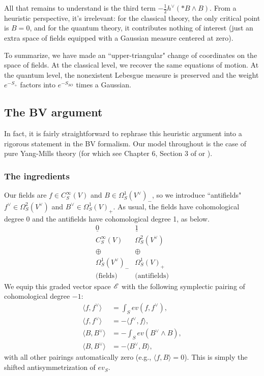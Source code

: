 All that remains to understand is the third term $ - \frac{1}{2}  h^\vee(\ast B \wedge B) $. From a heuristic perspective, it's irrelevant: for the classical theory, the only critical point is $B = 0$, and for the quantum theory, it contributes nothing of interest (just an extra space of fields equipped with a Gaussian measure centered at zero).

To summarize, we have made an ``upper-triangular" change of coordinates on the space of fields. At the classical level, we recover the same equations of motion. At the quantum level, the nonexistent Lebesgue measure is preserved and the weight $e^{-S_+}$  factors into $e^{-S_{SO}}$ times a Gaussian.

\subsection{The BV argument}

In fact, it is fairly straightforward to rephrase this heuristic argument into a rigorous statement in the BV formalism.
Our model throughout is the case of pure Yang-Mills theory (for which see Chapter 6, Section 3 of \cite{CosBook} or \cite{YMasBF}).

\subsubsection{The ingredients}

Our fields are $f \in C^\infty_S(V)$ and $B \in \Omega^1_S(V^\vee)_-$, so we introduce ``antifields" $f^\vee \in \Omega^2_S(V^\vee)$ and $B^\vee \in \Omega^1_S(V)_+$. As usual, the fields have cohomological degree 0 and the antifields have cohomological degree 1, as below.
\[
\begin{array}{cc}
\underline{0} & \underline{1} \\
C^\infty_S(V) & \Omega^2_S(V^\vee)\\
\oplus & \oplus \\
\Omega^1_S(V^\vee)_- & \Omega^1_S(V)_+\\
\text{(fields)} & \text{(antifields)}
\end{array}
\]
We equip this graded vector space $\mathscr E$ with the following symplectic pairing of cohomological degree $-1$:
\begin{align*}
\langle f, f^\vee \rangle &= \int_S ev(f , f^\vee),\\
\langle f, f^\vee \rangle &= - \langle f^\vee, f \rangle, \\
\langle B, B^\vee \rangle &= -\int_S ev(B^\vee \wedge B),\\
\langle B, B^\vee \rangle &= -\langle B^\vee, B \rangle,
\end{align*}
with all other pairings automatically zero (e.g., $\langle f, B \rangle = 0$). This is simply the shifted antisymmetrization of $ev_S$.


